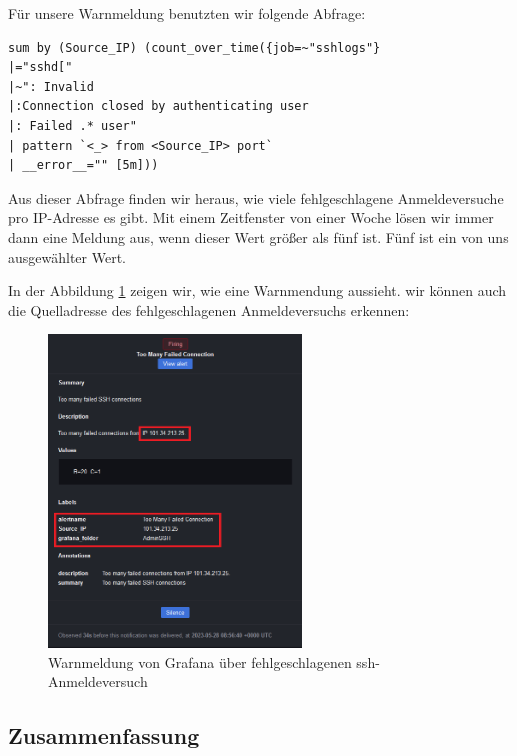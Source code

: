 Für unsere Warnmeldung benutzten wir folgende Abfrage:
\begin{center}
{
\begin{Verbatim}[frame=single]
sum by (Source_IP) (count_over_time({job=~"sshlogs"} 
|="sshd[" 
|~": Invalid
|:Connection closed by authenticating user
|: Failed .* user" 
| pattern `<_> from <Source_IP> port` 
| __error__="" [5m]))
\end{Verbatim}
}
\end{center}

Aus dieser Abfrage finden wir heraus, wie viele fehlgeschlagene Anmeldeversuche pro IP-Adresse es gibt. Mit einem Zeitfenster von einer Woche lösen wir immer dann eine Meldung aus, wenn dieser Wert größer als fünf ist. Fünf ist ein von uns ausgewählter Wert. 


\newpage
In der Abbildung \ref{fig:unsereWarnmeldung1} zeigen wir, wie eine Warnmendung aussieht. wir können auch die Quelladresse des fehlgeschlagenen Anmeldeversuchs erkennen:  
\begin{figure}[H]
  \centering
  \includegraphics[width=0.6\textwidth]{assets/OurAlert.png}
  \caption[Warnmeldung von Grafana über fehlgeschlagenen \gls{ssh}-Anmeldeversuch]
  {Warnmeldung von Grafana über fehlgeschlagenen \gls{ssh}-Anmeldeversuch}
  \centering
  \label{fig:unsereWarnmeldung1}
\end{figure}

\subsection{Zusammenfassung}

